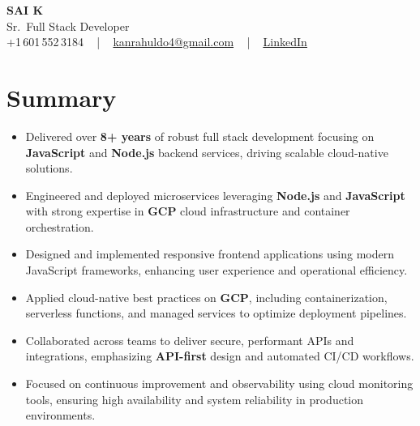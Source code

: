 \documentclass[letterpaper,11pt]{article}
\newcommand{\resumeItem}[1]{
  \item\footnotesize{
    {#1 \vspace{-2pt}}
  }
}
\newcommand{\resumeItemListStart}{\begin{itemize}[leftmargin=*]}
\newcommand{\resumeItemListEnd}{\end{itemize}\vspace{-5pt}}
\begin{document}
\begin{center}
    {\fontsize{14pt}{12pt}\selectfont \textbf{\MakeUppercase{Sai K}}}\\ \vspace{2pt}
    \fontsize{10pt}{12pt}\selectfont Sr.\ Full Stack Developer\\ \vspace{2pt}
    \fontsize{10pt}{12pt}\selectfont +1\,601\,552\,3184 ~ | ~
    \href{mailto:kanrahuldo4@gmail.com}{kanrahuldo4@gmail.com} ~ | ~
    \href{https://www.linkedin.com/in/srrrk/}{\color{blue}\underline{LinkedIn}}
    \vspace{-10pt}
\end{center}

\section{Summary}
\fontsize{9pt}{10pt}\selectfont
\resumeItemListStart
  \resumeItem{Delivered over \textbf{8+ years} of robust full stack development focusing on \textbf{JavaScript} and \textbf{Node.js} backend services, driving scalable cloud-native solutions.}
  \resumeItem{Engineered and deployed microservices leveraging \textbf{Node.js} and \textbf{JavaScript} with strong expertise in \textbf{GCP} cloud infrastructure and container orchestration.}
  \resumeItem{Designed and implemented responsive frontend applications using modern JavaScript frameworks, enhancing user experience and operational efficiency.}
  \resumeItem{Applied cloud-native best practices on \textbf{GCP}, including containerization, serverless functions, and managed services to optimize deployment pipelines.}
  \resumeItem{Collaborated across teams to deliver secure, performant APIs and integrations, emphasizing \textbf{API-first} design and automated CI/CD workflows.}
  \resumeItem{Focused on continuous improvement and observability using cloud monitoring tools, ensuring high availability and system reliability in production environments.}
\resumeItemListEnd
\vspace{-6pt}

\end{document}
